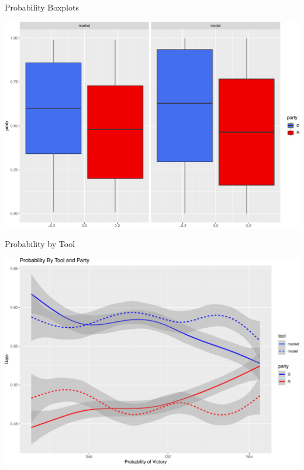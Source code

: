 \documentclass[ignorenonframetext,]{beamer}
\begin{document}
\begin{frame}{Probability Boxplots}

\includegraphics{markets_models_files/figure-beamer/prob box-1.pdf}

\end{frame}

\begin{frame}{Probability by Tool}

\includegraphics{markets_models_files/figure-beamer/prob tool-1.pdf}

\end{frame}
\end{document}
